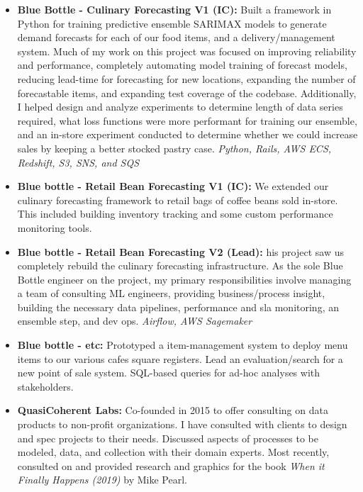 \documentclass[a4paper,10pt,notitlepage]{article}
\begin{document}
    \begin{itemize}
        \vspace{-5pt}\item \textbf{Blue Bottle - Culinary Forecasting V1 (IC):} Built a framework in Python for training predictive ensemble SARIMAX models to generate demand forecasts for each of our food items, and a delivery/management system. Much of my work on this project was focused on improving reliability and performance, completely automating model training of forecast models, reducing lead-time for forecasting for new locations, expanding the number of forecastable items, and expanding test coverage of the codebase. Additionally, I helped design and analyze experiments to determine length of data series required, what loss functions were more performant for training our ensemble, and an in-store experiment conducted to determine whether we could increase sales by keeping a better stocked pastry case. \emph{Python, Rails, AWS ECS, Redshift, S3, SNS, and SQS}
        \vspace{-5pt}\item \textbf{Blue bottle - Retail Bean Forecasting V1 (IC):} We extended our culinary forecasting framework to retail bags of coffee beans sold in-store. This included building inventory tracking and some custom performance monitoring tools.
        \vspace{-5pt}\item \textbf{Blue bottle - Retail Bean Forecasting V2 (Lead):} his project saw us completely rebuild the culinary forecasting infrastructure. As the sole Blue Bottle engineer on the project, my primary responsibilities involve managing a team of consulting ML engineers, providing business/process insight, building the necessary data pipelines, performance and sla monitoring, an ensemble step, and dev ops. \emph{Airflow, AWS Sagemaker}
        \vspace{-5pt}\item \textbf{Blue bottle - etc:} Prototyped a item-management system to deploy menu items to our various cafes square registers. Lead an evaluation/search for a new point of sale system. SQL-based queries for ad-hoc analyses with stakeholders.
        \vspace{-5pt}\item \textbf{QuasiCoherent Labs:} Co-founded in 2015 to offer consulting on data products to non-profit organizations. I have consulted with clients to design and spec projects to their needs. Discussed aspects of processes to be modeled, data, and collection with their domain experts. Most recently, consulted on and provided research and graphics for the book \emph{When it Finally Happens (2019)} by Mike Pearl.

\end{itemize}
\end{document}
